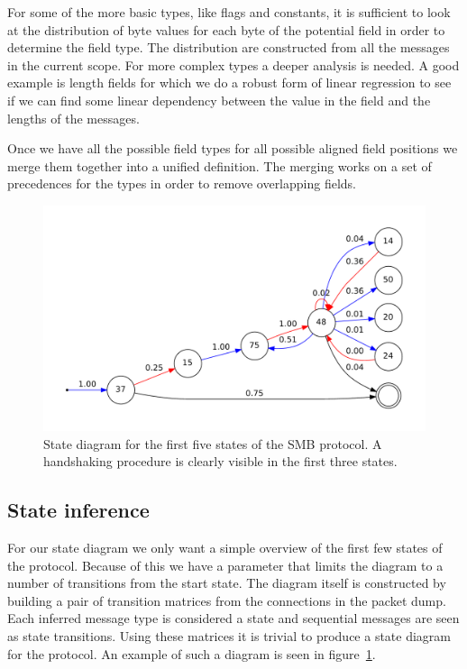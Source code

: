 \documentclass[a4paper,twocolumn]{article}
\begin{document}
For some of the more basic types, like flags and constants, it is sufficient to
look at the distribution of byte values for each byte of the potential field in
order to determine the field type. The distribution are constructed from all
the messages in the current scope. For more complex types a deeper analysis is
needed. A good example is length fields for which we do a robust form of linear
regression to see if we can find some linear dependency between the value in
the field and the lengths of the messages.

Once we have all the possible field types for all possible aligned field
positions we merge them together into a unified definition. The merging works
on a set of precedences for the types in order to remove overlapping fields.

\begin{figure}[h]
    \includegraphics[width=\linewidth]{img/smbstate}
    \caption{State diagram for the first five states of the SMB protocol. A
        handshaking procedure is clearly visible in the first three states.}
    \label{fig:smbstate}
\end{figure}

\subsection{State inference}
For our state diagram we only want a simple overview of the first few states
of the protocol. Because of this we have a parameter that limits the diagram to
a number of transitions from the start state. The diagram itself is constructed
by building a pair of transition matrices from the connections in the packet
dump. Each inferred message type is considered a state and sequential messages
are seen as state transitions. Using these matrices it is trivial to produce a
state diagram for the protocol. An example of such a diagram is seen in
figure~\ref{fig:smbstate}.
\end{document}
